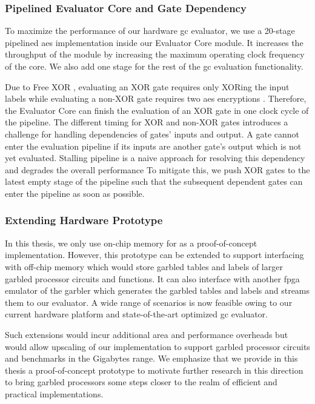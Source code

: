 \subsubsection{Pipelined Evaluator Core and Gate Dependency} \label{ssec:processor-hardware-pipeline}
To maximize the performance of our hardware \acrshort{gc} evaluator, we use a 20-stage pipelined \acrshort{aes} implementation \cite{hsing2013tiny} inside our Evaluator Core module.
It increases the throughput of the module by increasing the maximum operating clock frequency of the core.
We also add one stage for the rest of the \acrshort{gc} evaluation functionality.

Due to Free XOR \cite{kolesnikov2008improved}, evaluating an XOR gate requires only XORing the input labels while evaluating a non-XOR gate requires two \acrshort{aes} encryptions \cite{zahur2015two}.
Therefore, the Evaluator Core can finish the evaluation of an XOR gate in one clock cycle of the pipeline.
The different timing for XOR and non-XOR gates introduces a challenge for handling dependencies of gates' inputs and output.
A gate cannot enter the evaluation pipeline if its inputs are another gate's output which is not yet evaluated.
Stalling pipeline is a naive approach for resolving this dependency and degrades the overall performance
To mitigate this, we push XOR gates to the latest empty stage of the pipeline such that the subsequent dependent gates can enter the pipeline as soon as possible.

\subsubsection{Extending Hardware Prototype} \label{ssec:processor-hardware-extend}
In this thesis, we only use on-chip memory for as a proof-of-concept implementation.
However, this prototype can be extended to support interfacing with off-chip memory which would store garbled tables and labels of larger garbled processor circuits and functions.
It can also interface with another \acrshort{fpga} emulator of the garbler which generates the garbled tables and labels and streams them to our evaluator.
A wide range of scenarios is now feasible owing to our current hardware platform and state-of-the-art optimized \acrshort{gc} evaluator.

Such extensions would incur additional area and performance overheads but would allow upscaling of our implementation to support garbled processor circuits and benchmarks in the Gigabytes range.
We emphasize that we provide in this thesis a proof-of-concept prototype to motivate further research in this direction to bring garbled processors some steps closer to the realm of efficient and practical implementations.

